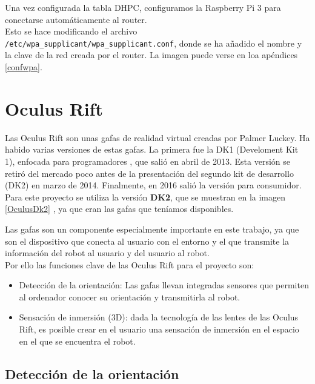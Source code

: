 \documentclass[twoside, 11pt]{epstfg}
\begin{document}
Una vez configurada la tabla DHPC, configuramos la Raspberry Pi 3 para conectarse automáticamente al router.\\
Esto se hace modificando el archivo \texttt{/etc/wpa\_supplicant/wpa\_supplicant.conf}, donde se ha añadido el nombre y la clave de la red creada por el router. La imagen puede verse en loa apéndices \ref{confwpa}. 

\section{Oculus Rift}

Las Oculus Rift son unas gafas de realidad virtual creadas por Palmer Luckey.
Ha habido varias versiones de estas gafas.
La primera fue la DK1 (Develoment Kit 1), enfocada para programadores , que salió en abril de 2013. Esta versión se retiró del mercado poco antes de la presentación del segundo kit de desarrollo (DK2) en marzo de 2014.
Finalmente, en 2016 salió la versión para consumidor.\\
Para este proyecto se utiliza la versión \textbf{DK2}, que se muestran en la imagen \ref{OculusDk2} , ya que eran las gafas que teníamos disponibles.


Las gafas son un componente especialmente importante en este trabajo, ya que son el dispositivo que conecta al usuario con el entorno y el que transmite la información del robot al usuario y del usuario al robot.\\
Por ello las funciones clave de las Oculus Rift para el proyecto son:
\begin{itemize}
	\item Detección de la orientación: Las gafas llevan integradas sensores que permiten al ordenador conocer su orientación y transmitirla al robot.
	\item Sensación de inmersión (3D): dada la tecnología de las lentes de las Oculus Rift, es posible crear en el usuario una sensación de inmersión en el espacio en el que se encuentra el robot.
\end{itemize}

\subsection{Detección de la orientación}
\end{document}
